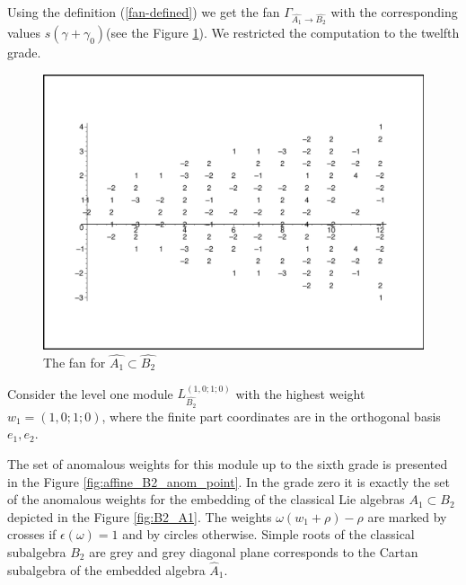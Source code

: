 \documentclass[a4paper,12pt]{article}
\theoremstyle{definition} \newtheorem{Def}{Definition}
\begin{document}
Using the definition (\ref{fan-defined}) we get the fan
$\Gamma_{\hat{A_1} \longrightarrow  \hat{B_2} }$
with the corresponding values $s(\gamma+\gamma_0)$(see the Figure \ref{fig:AffineB2A1Fan}).
We restricted the computation to the twelfth grade.
\begin{figure}[h!bt]
  \centering
  \includegraphics[width=135mm]{AffineB2_A1_fan.pdf}
  \caption{The fan for $\hat{A_1}\subset \hat{B_2}$}
  \label{fig:AffineB2A1Fan}
\end{figure}


Consider the level one module $L^{\left( 1,0;1;0 \right)}_{\hat{B_2}}$  with the highest weight $w_1=(1,0;1;0)$,
where the finite part coordinates are in the orthogonal basis $e_1,e_2$.

The set of anomalous weights for this module up to the sixth grade is presented in the Figure \ref{fig:affine_B2_anom_point}.
In the grade zero it is exactly the set of the anomalous weights for the embedding of
the classical Lie algebras $A_1\subset B_2$ depicted in the  Figure \ref{fig:B2_A1}.
The weights $\omega (w_1+\rho)-\rho$ are marked by crosses if $\epsilon(\omega)=1$ and by circles otherwise.
Simple roots of the classical subalgebra $B_2$ are grey and grey diagonal plane corresponds to the Cartan subalgebra
of the embedded algebra $\hat{A}_1$.
\end{document}
